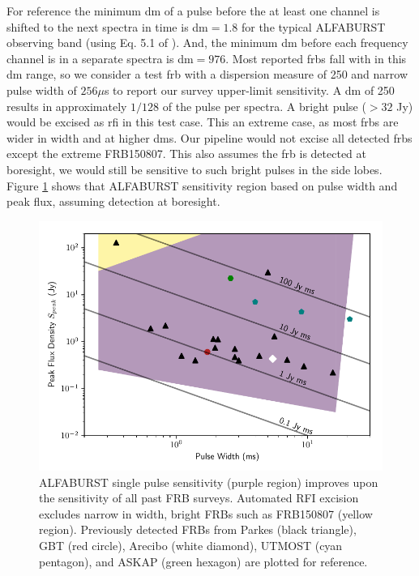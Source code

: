 \documentclass[a4paper,fleqn,usenatbib]{mnras}
\begin{document}
For reference the minimum \gls{dm} of a pulse before the at least one channel is
shifted to the next spectra in time is \gls{dm}$=1.8$ for the typical ALFABURST
observing band (using Eq. 5.1 of \cite{2004hpa..book.....L}). And, the minimum
\gls{dm} before each frequency channel is in a separate spectra is
\gls{dm}$=976$. Most reported \glspl{frb} fall with in this \gls{dm} range, so
we consider a test \gls{frb} with a dispersion measure of 250 and narrow
pulse width of $256 \mu$s to report our survey upper-limit sensitivity. A
\gls{dm} of 250 results in approximately $1/128$ of the pulse per spectra. A
bright pulse ($>32$ Jy) would be excised as \gls{rfi} in this test case. This an
extreme case, as most \glspl{frb} are wider in width and at higher \glspl{dm}.
Our pipeline would not excise all detected \glspl{frb} except the extreme
FRB150807.  This also assumes the \gls{frb} is detected at boresight, we would
still be sensitive to such bright pulses in the side lobes. Figure
\ref{fig:fluence_rate} shows that ALFABURST sensitivity region based on pulse
width and peak flux, assuming detection at boresight.

\begin{figure}
    \includegraphics[width=1.0\linewidth]{figures/fluence_rate.pdf}
    \caption{ALFABURST single pulse sensitivity (purple region) improves upon
    the sensitivity of all past FRB surveys. Automated RFI excision excludes
    narrow in width, bright FRBs such as FRB150807 (yellow region). Previously
    detected FRBs from Parkes (black triangle), GBT (red circle), Arecibo (white
    diamond), UTMOST (cyan pentagon), and ASKAP (green hexagon) are plotted for
    reference.
    }
    \label{fig:fluence_rate}
\end{figure}
\end{document}
